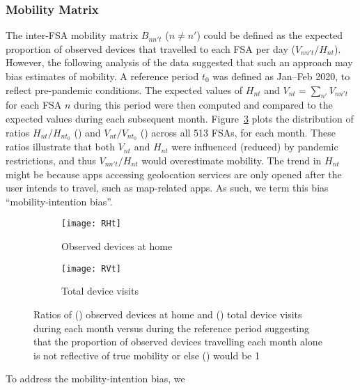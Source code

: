 \subsubsection{Mobility Matrix}\label{app.mob.matrix}
The inter-FSA mobility matrix $B_{nn't}$ ($n \ne n'$) could be defined as
the expected proportion of observed devices that travelled to each FSA per day ($V_{nn't} / H_{nt}$).
However, the following analysis of the data suggested that such an approach may bias estimates of mobility.
A reference period $t_0$ was defined as Jan--Feb 2020, to reflect pre-pandemic conditions.
The expected values of $H_{nt}$ and $V_{nt} = \sum_{n'}V_{nn't}$ for each FSA $n$ during this period
were then computed and compared to the expected values during each subsequent month.
Figure~\ref{fig:RHVt} plots the distribution of ratios
$H_{nt} / H_{nt_0}$ () and $V_{nt} / V_{nt_0}$ ()
across all 513 FSAs, for each month.
These ratios illustrate that both $V_{nt}$ and $H_{nt}$ were influenced (reduced) by pandemic restrictions,
and thus $V_{nn't} / H_{nt}$ would overestimate mobility.
The trend in $H_{nt}$ might be because apps accessing geolocation services are only opened
after the user intends to travel, such as map-related apps.
As such, we term this bias ``mobility-intention bias''.
\begin{figure}
  \centering
  \begin{subfigure}[t]{0.45\linewidth}
    \texttt{[image: RHt]}
    \caption{Observed devices at home}
    \label{fig:RHt}
  \end{subfigure}\quad
  \begin{subfigure}[t]{0.45\linewidth}
    \texttt{[image: RVt]}
    \caption{Total device visits}
    \label{fig:RVt}
  \end{subfigure}
  \caption{Ratios of () observed devices at home
    and () total device visits
    during each month versus during the reference period
    suggesting that the proportion of observed devices travelling each month
    alone is not reflective of true mobility or else () would be 1}
  \label{fig:RHVt}
\end{figure}
\par
To address the mobility-intention bias, we
